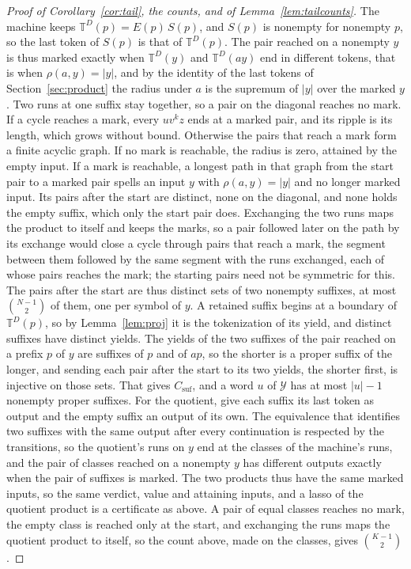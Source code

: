\documentclass[11pt,a4paper]{article}
\theoremstyle{definition}
\theoremstyle{plain}
\newcommand{\T}{\mathbb{T}}
\begin{document}
\begin{proof}[Proof of Corollary~\ref{cor:tail}, the counts, and of Lemma~\ref{lem:tailcounts}]
The machine keeps \(\T^D(p) = E(p)\,S(p)\), and \(S(p)\) is nonempty for nonempty \(p\), so the last token of \(S(p)\)
is that of \(\T^D(p)\). The pair reached on a nonempty \(y\) is thus marked exactly when \(\T^D(y)\) and \(\T^D(ay)\)
end in different tokens, that is when \(\rho(a, y) = |y|\), and by the identity of the last tokens of
Section~\ref{sec:product} the radius under \(a\) is the supremum of \(|y|\) over the marked \(y\). Two runs at one
suffix stay together, so a pair on the diagonal reaches no mark. If a cycle reaches a mark, every \(u v^k z\) ends at a
marked pair, and its ripple is its length, which grows without bound. Otherwise the pairs that reach a mark form a
finite acyclic graph. If no mark is reachable, the radius is zero, attained by the empty input. If a mark is reachable,
a longest path in that graph from the start pair to a marked pair spells an input \(y\) with \(\rho(a, y) = |y|\) and no
longer marked input. Its pairs after the start are distinct, none on the diagonal, and none holds the empty suffix,
which only the start pair does. Exchanging the two runs maps the product to itself and keeps the marks, so a pair
followed later on the path by its exchange would close a cycle through pairs that reach a mark, the segment between them
followed by the same segment with the runs exchanged, each of whose pairs reaches the mark; the starting pairs need not
be symmetric for this. The pairs after the start are thus distinct sets of two nonempty suffixes, at most
\(\binom{N - 1}{2}\) of them, one per symbol of \(y\). A retained suffix begins at a boundary of \(\T^D(p)\), so by
Lemma~\ref{lem:proj} it is the tokenization of its yield, and distinct suffixes have distinct yields. The yields of the
two suffixes of the pair reached on a prefix \(p\) of \(y\) are suffixes of \(p\) and of \(ap\), so the shorter is a
proper suffix of the longer, and sending each pair after the start to its two yields, the shorter first, is injective on
those sets. That gives \(C_{\mathrm{suf}}\), and a word \(u\) of \(\mathcal{Y}\) has at most \(|u| - 1\) nonempty proper
suffixes. For the quotient, give each suffix its last token as output and the empty suffix an output of its own. The
equivalence that identifies two suffixes with the same output after every continuation is respected by the transitions,
so the quotient's runs on \(y\) end at the classes of the machine's runs, and the pair of classes reached on a nonempty
\(y\) has different outputs exactly when the pair of suffixes is marked. The two products thus have the same marked
inputs, so the same verdict, value and attaining inputs, and a lasso of the quotient product is a certificate as above.
A pair of equal classes reaches no mark, the empty class is reached only at the start, and exchanging the runs maps the
quotient product to itself, so the count above, made on the classes, gives \(\binom{K - 1}{2}\).


\end{proof}
\end{document}
